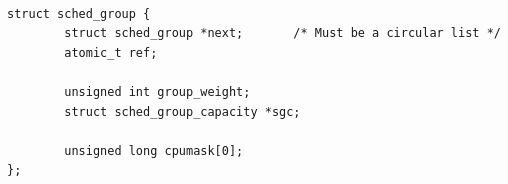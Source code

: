 \documentclass[
  field=ainfk,
  biblatex,
  glossaries,
  index
]{kidiplom}
\begin{document}
%
%
%
%
%
%
%
%

\begin{verbatim} 

struct sched_group {
        struct sched_group *next;       /* Must be a circular list */
        atomic_t ref;

        unsigned int group_weight;
        struct sched_group_capacity *sgc;

        unsigned long cpumask[0];
};

\end{verbatim} 
\end{document}
